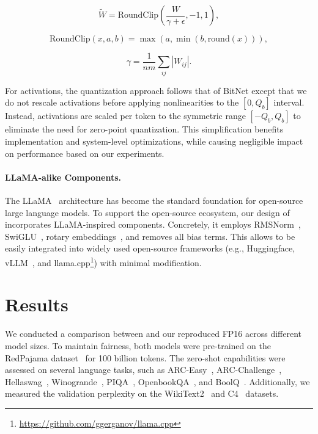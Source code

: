 \begin{equation}
    \widetilde{W} = \mathrm{RoundClip}\left(\frac{W}{\gamma + \epsilon}, -1, 1\right),
\end{equation}

\begin{equation}
    \mathrm{RoundClip}(x, a, b) = \max(a, \min(b, \mathrm{round}(x))),
\end{equation}

\begin{equation}
    \gamma = \frac{1}{nm}\sum_{ij} |W_{ij}|.
\end{equation}

For activations, the quantization approach follows that of BitNet except that we do not rescale activations before applying nonlinearities to the $[0, Q_b]$ interval. Instead, activations are scaled per token to the symmetric range $[-Q_b, Q_b]$ to eliminate the need for zero-point quantization. This simplification benefits implementation and system-level optimizations, while causing negligible impact on performance based on our experiments.

\paragraph{LLaMA-alike Components.}

The LLaMA~\cite{llama, llama2} architecture has become the standard foundation for open-source large language models. To support the open-source ecosystem, our design of  incorporates LLaMA-inspired components. Concretely, it employs RMSNorm~\cite{rmsnorm}, SwiGLU~\cite{swiglu}, rotary embeddings~\cite{rope}, and removes all bias terms. This allows  to be easily integrated into widely used open-source frameworks (e.g., Huggingface, vLLM~\cite{vllm}, and llama.cpp\footnote{\url{https://github.com/ggerganov/llama.cpp}}) with minimal modification.

\section{Results}

We conducted a comparison between  and our reproduced FP16  across different model sizes. To maintain fairness, both models were pre-trained on the RedPajama dataset~\cite{redpajama} for 100 billion tokens. The zero-shot capabilities were assessed on several language tasks, such as ARC-Easy~\cite{arc}, ARC-Challenge~\cite{arc}, Hellaswag~\cite{hellaswag}, Winogrande~\cite{winoGrande}, PIQA~\cite{piqa}, OpenbookQA~\cite{openbookqa}, and BoolQ~\cite{boolq}. Additionally, we measured the validation perplexity on the WikiText2~\cite{wikitext2} and C4~\cite{c4} datasets.

